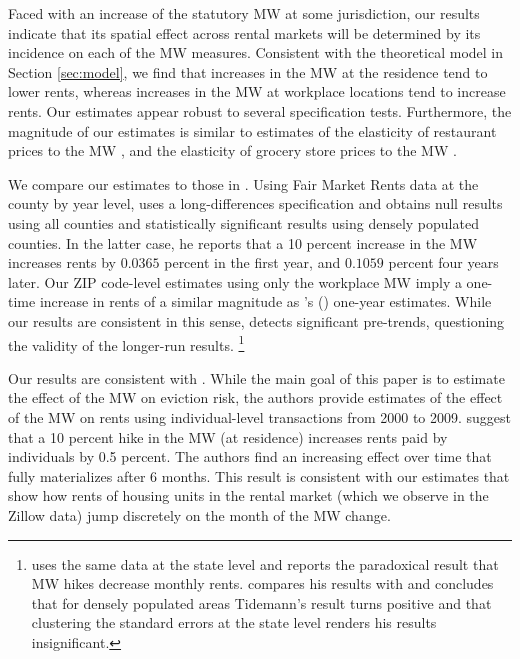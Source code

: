 Faced with an increase of the statutory MW at some jurisdiction, our results
indicate that its spatial effect across rental markets will be determined by 
its incidence on each of the MW measures.
Consistent with the theoretical model in Section \ref{sec:model}, we find that 
increases in the MW at the residence tend to lower rents, whereas increases 
in the MW at workplace locations tend to increase rents.
Our estimates appear robust to several specification tests.
Furthermore, the magnitude of our estimates is similar to estimates of the
elasticity of restaurant prices to the MW \parencite{AllegrettoReich2018},
and the elasticity of grocery store prices to the MW 
\parencite{RenkinEtAl2020, Leung2021}.

We compare our estimates to those in \textcite{Yamagishi2019, AgarwalEtAl2021}.
Using Fair Market Rents data at the county by year level, 
\textcite[][, Tables 1 and 2]{Yamagishi2019} uses a long-differences 
specification and obtains null results using all counties and statistically 
significant results using densely populated counties.
In the latter case, he reports that a 10 percent increase in the MW increases
rents by $0.0365$ percent in the first year, and $0.1059$ percent four years 
later.
Our ZIP code-level estimates using only the workplace MW imply a one-time 
increase in rents of a similar magnitude as \citeauthor{Yamagishi2019}'s 
(\citeyear[][Table 2, Column 1]{Yamagishi2019}) one-year estimates.
While our results are consistent in this sense, 
\textcite[][Table 3]{Yamagishi2019} detects significant pre-trends,
questioning the validity of the longer-run results.%
\footnote{\textcite{Tidemann2018} uses the same data at the state level and 
reports the paradoxical result that MW hikes decrease monthly rents.
\textcite[][, Appendix C.1.3.]{Yamagishi2019} compares his results with 
\textcite{Tidemann2018} and concludes that for densely populated areas 
Tidemann's result turns positive and that clustering the standard errors at the
state level renders his results insignificant.}

Our results are consistent with \textcite{AgarwalEtAl2021}.
While the main goal of this paper is to estimate the effect of the MW on eviction
risk, the authors provide estimates of the effect of the MW on rents using
individual-level transactions from 2000 to 2009.
\textcite[][, Figure 4]{AgarwalEtAl2021} suggest that a 10 percent hike 
in the MW (at residence) increases rents paid by individuals by 0.5 percent.
The authors find an increasing effect over time that fully materializes after 
6 months.
This result is consistent with our estimates that show how rents of housing 
units in the rental market (which we observe in the Zillow data) jump 
discretely on the month of the MW change.
